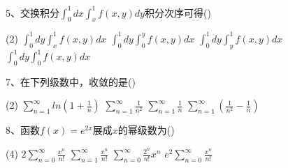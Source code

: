 \documentclass[12pt,a3paper]{article}
\begin{document}
5、交换积分$\int_0^1 dx \int_x^1 f(x,y)dy$积分次序可得\hfill(\qquad)
\begin{tasks}(2)
    \task $\int_0^1dy\int_x^1f(x,y)dx$
    \task $\int_0^1dy\int_0^yf(x,y)dx$
    \task $\int_0^1dy\int_y^1f(x,y)dx$
    \task $\int_0^1dy\int_0^1f(x,y)dx$
    \\
\end{tasks}
7、在下列级数中，收敛的是\hfill(\qquad)
\begin{tasks}(2)
    \task $\sum_{n=1}^\infty ln(1+\frac{1}{n})$
    \task $\sum_{n=1}^\infty \frac{1}{n^2}$
    \task $\sum_{n=1}^\infty \frac{1}{n}$
    \task $\sum_{n=1}^\infty (\frac{1}{n^2}-\frac{1}{n})$
    \\
\end{tasks}
8、函数$f(x)=e^{2x}$展成$x$的幂级数为\hfill(\qquad)
\begin{tasks}(4)
    \task $2\sum_{n=0}^\infty \frac{x^n}{n!}$
    \task $\sum_{n=1}^\infty \frac{x^n}{n!}$
    \task $\sum_{n=0}^\infty \frac{2^n}{n!}x^n$
    \task $e^2\sum_{n=0}^\infty \frac{x^n}{n!}$
\end{tasks}
\clearpage
\end{document}
